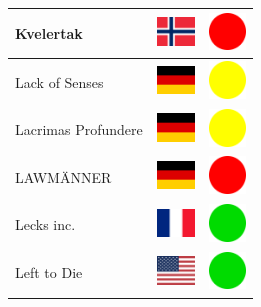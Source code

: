 \documentclass[12pt, a4paper, twoside]{report}
\begin{document}
\begin{center}
\begin{longtable}{|p{5cm}|p{2cm}|p{2cm}|}
 Kvelertak                                                  & \includegraphics[width=1cm]{../img/flags/no} &   \includegraphics[width=1cm]{../likes/n} \\ \hline
 Lack of Senses                                             & \includegraphics[width=1cm]{../img/flags/de} &   \includegraphics[width=1cm]{../likes/m} \\ \hline
 Lacrimas Profundere                                        & \includegraphics[width=1cm]{../img/flags/de} &   \includegraphics[width=1cm]{../likes/m} \\ \hline
 LAWMÄNNER                                                  & \includegraphics[width=1cm]{../img/flags/de} &   \includegraphics[width=1cm]{../likes/n} \\ \hline
 Lecks inc.                                                 & \includegraphics[width=1cm]{../img/flags/fr} &   \includegraphics[width=1cm]{../likes/y} \\ \hline
 Left to Die                                                & \includegraphics[width=1cm]{../img/flags/us} &   \includegraphics[width=1cm]{../likes/y} \\ \hline

\end{longtable}
\end{center}
\end{document}
